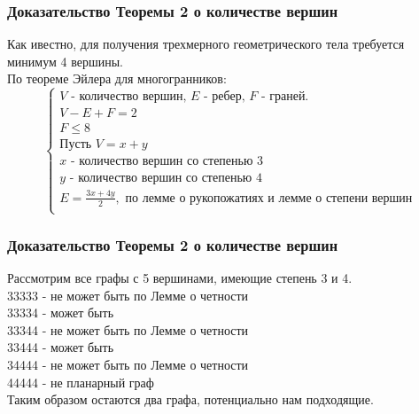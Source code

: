 \documentclass[10pt,pdf,hyperref={unicode}]{beamer}
\begin{document}
\begin{frame}
	\frametitle{Доказательство Теоремы 2 о количестве вершин}
	\hypertarget{theorem2}{}
	Как ивестно, для получения трехмерного геометрического тела требуется минимум 4 вершины. \\
	По теореме Эйлера для многогранников: 
	\begin{equation*}
	\left\{
		\begin{array}{lc}
		\mbox{$V$ - количество вершин, $E$ - ребер, $F$ - граней.} \\
		V-E+F=2 \\
		F\le8 \\
		\mbox{Пусть }V=x+y \\
		\mbox{$x$ - количество вершин со степенью 3}\\ 
		\mbox{$y$ - количество вершин со степенью 4} \\
		E=\frac{3x+4y}{2}, 
		\mbox{ по лемме о рукопожатиях и лемме о степени вершин}\\
	\end{array}
\end{equation*}
\end{frame}
\begin{frame}
	\frametitle{Доказательство Теоремы 2 о количестве вершин}
	Рассмотрим все графы с 5 вершинами, имеющие степень 3 и 4.\\
\hfill \break	
	{\large	
		33333 - не может быть по Лемме о четности\\
		33334 - может быть\\
		33344 - не может быть по Лемме о четности\\
		33444 - может быть\\
		34444 - не может быть по Лемме о четности\\
		44444 - не планарный граф
\\	
\hfill \break	
	Таким образом остаются два графа, потенциально нам подходящие.
}
\end{frame}
\end{document}
